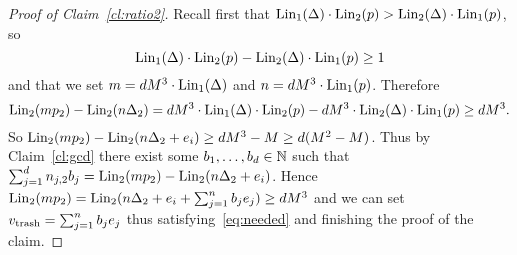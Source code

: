 \begin{proof}[Proof of Claim~\ref{cl:ratio2}]
Recall first that $\textup{Lin}_1(\Delta) \cdot \textup{Lin}_2(p) > \textup{Lin}_2(\Delta) \cdot \textup{Lin}_1(p)$, so 
\[
\textup{Lin}_1(\Delta) \cdot \textup{Lin}_2(p) - \textup{Lin}_2(\Delta) \cdot \textup{Lin}_1(p) \geq 1
\]
and that we set $m = dM^3 \cdot \textup{Lin}_1(\Delta)$ and $n = dM^3 \cdot \textup{Lin}_1(p)$.
Therefore
\[
\textup{Lin}_2(m p_2) - \textup{Lin}_2(n \Delta_2) = dM^3 \cdot \textup{Lin}_1(\Delta) \cdot \textup{Lin}_2(p) - dM^3 \cdot \textup{Lin}_2(\Delta) \cdot \textup{Lin}_1(p) \geq dM^3.
\]
So $\textup{Lin}_2(m p_2) - \textup{Lin}_2(n \Delta_2 + e_i) \geq dM^3 - M \geq d(M^2 - M)$. Thus by Claim~\ref{cl:gcd}
there exist some $b_1, \ldots, b_d \in \mathbb{N}$ such that $\sum_{j=1}^d n_{j,2} b_j = \textup{Lin}_2(m p_2) - \textup{Lin}_2(n \Delta_2 + e_i)$.
Hence $\textup{Lin}_2(m p_2) = \textup{Lin}_2(n \Delta_2 + e_i + \sum_{j=1}^n b_j e_j) \geq dM^3$
and we can set $v_{\textup{trash}} =  \sum_{j=1}^n b_j e_j$ thus satisfying~\eqref{eq:needed}
and finishing the proof of the claim.
\end{proof}